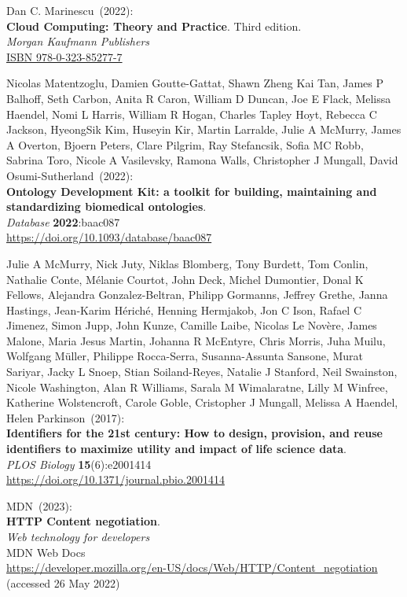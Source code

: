 \begin{thebibliography}{9}
Dan C. Marinescu~(2022): \\
\textbf{Cloud Computing: Theory and Practice}.
Third edition.\\
\emph{Morgan Kaufmann Publishers}\\
\href{https://identifiers.org/isbn/9780323852777}{ISBN 978-0-323-85277-7}

Nicolas Matentzoglu, Damien Goutte-Gattat, Shawn Zheng Kai Tan, James P Balhoff, Seth Carbon, Anita R Caron, William D Duncan, Joe E Flack, Melissa Haendel, Nomi L Harris, William R Hogan, Charles Tapley Hoyt, Rebecca C Jackson, HyeongSik Kim, Huseyin Kir, Martin Larralde, Julie A McMurry, James A Overton, Bjoern Peters, Clare Pilgrim, Ray Stefancsik, Sofia MC Robb, Sabrina Toro, Nicole A Vasilevsky, Ramona Walls, Christopher J Mungall, David Osumi-Sutherland~(2022): \\
\textbf{Ontology Development Kit: a toolkit for building, maintaining and standardizing biomedical ontologies}.\\
\emph{Database} \textbf{2022}:baac087 \\
\url{https://doi.org/10.1093/database/baac087}

Julie A McMurry, Nick Juty, Niklas Blomberg, Tony Burdett, Tom Conlin, Nathalie Conte, Mélanie Courtot, John Deck, Michel Dumontier, Donal K Fellows, Alejandra Gonzalez-Beltran, Philipp Gormanns, Jeffrey Grethe, Janna Hastings, Jean-Karim Hériché, Henning Hermjakob, Jon C Ison, Rafael C Jimenez, Simon Jupp, John Kunze, Camille Laibe, Nicolas Le Novère, James Malone, Maria Jesus Martin, Johanna R McEntyre, Chris Morris, Juha Muilu, Wolfgang Müller, Philippe Rocca-Serra, Susanna-Assunta Sansone, Murat Sariyar, Jacky L Snoep, Stian Soiland-Reyes, Natalie J Stanford, Neil Swainston, Nicole Washington, Alan R Williams, Sarala M Wimalaratne, Lilly M Winfree, Katherine Wolstencroft, Carole Goble, Cristopher J Mungall, Melissa A Haendel, Helen Parkinson~(2017): \\
\textbf{Identifiers for the 21st century: How to design, provision, and reuse identifiers to maximize utility and impact of life science data}.\\
\emph{PLOS Biology} \textbf{15}(6):e2001414\\
\url{https://doi.org/10.1371/journal.pbio.2001414}

MDN~(2023): \\
\textbf{HTTP Content negotiation}.\\
\emph{Web technology for developers}\\
MDN Web Docs \\
\url{https://developer.mozilla.org/en-US/docs/Web/HTTP/Content_negotiation}
(accessed 26 May 2022)


\end{thebibliography}
